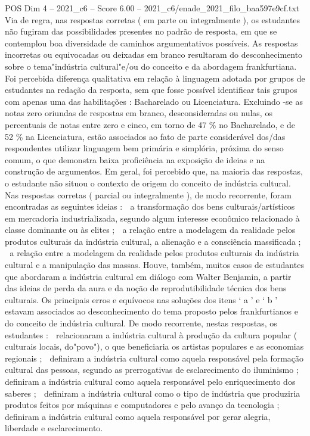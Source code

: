 \begin{textsample}{POS Dim 4 – 2021\_c6 – Score 6.00 – 2021\_c6/enade\_2021\_filo\_baa597e9cf.txt}
Via de regra, nas respostas corretas ( em parte ou integralmente ), os estudantes não fugiram das possibilidades presentes no padrão de resposta, em que se contemplou boa diversidade de caminhos argumentativos possíveis.
As respostas incorretas ou equivocadas ou deixadas em branco resultaram do desconhecimento sobre o tema"indústria cultural"e/ou do conceito e da abordagem frankfurtiana.
Foi percebida diferença qualitativa em relação à linguagem adotada por grupos de estudantes na redação da resposta, sem que fosse possível identificar tais grupos com apenas uma das habilitações : Bacharelado ou Licenciatura.
Excluindo -se as notas zero oriundas de respostas em branco, desconsideradas ou nulas, os percentuais de notas entre zero e cinco, em torno de 47 \% no Bacharelado, e de 52 \% na Licenciatura, estão associados ao fato de parte considerável dos/das respondentes utilizar linguagem bem primária e simplória, próxima do senso comum, o que demonstra baixa proficiência na exposição de ideias e na construção de argumentos.
Em geral, foi percebido que, na maioria das respostas, o estudante não situou o contexto de origem do conceito de indústria cultural.
Nas respostas corretas ( parcial ou integralmente ), de modo recorrente, foram encontradas as seguintes ideias :  a transformação dos bens culturais/artísticos em mercadoria industrializada, segundo algum interesse econômico relacionado à classe dominante ou às elites ;  a relação entre a modelagem da realidade pelos produtos culturais da indústria cultural, a alienação e a consciência massificada ;  a relação entre a modelagem da realidade pelos produtos culturais da indústria cultural e a manipulação das massas.
Houve, também, muitos casos de estudantes que abordaram a indústria cultural em diálogo com Walter Benjamin, a partir das ideias de perda da aura e da noção de reprodutibilidade técnica dos bens culturais.
Os principais erros e equívocos nas soluções dos itens ‘ a ’ e ‘ b ' estavam associados ao desconhecimento do tema proposto pelos frankfurtianos e do conceito de indústria cultural.
De modo recorrente, nestas respostas, os estudantes :  relacionaram a indústria cultural à produção da cultura popular ( culturais locais, do"povo"), o que beneficiaria os artistas populares e as economias regionais ;  definiram a indústria cultural como aquela responsável pela formação cultural das pessoas, segundo as prerrogativas de esclarecimento do iluminismo ;  definiram a indústria cultural como aquela responsável pelo enriquecimento dos saberes ;  definiram a indústria cultural como o tipo de indústria que produziria produtos feitos por máquinas e computadores e pelo avanço da tecnologia ;  definiram a indústria cultural como aquela responsável por gerar alegria, liberdade e esclarecimento.

\end{textsample}
